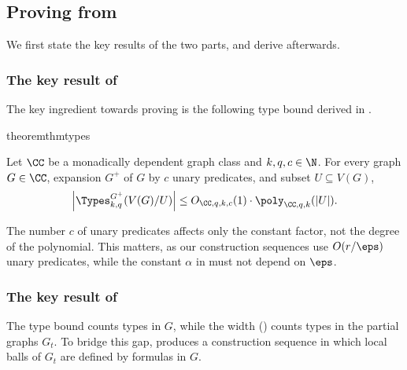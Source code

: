 \subsection{Proving \texorpdfstring{ from }{Theorem  from Parts I and II}}\label{sec:skel-few-types}

We first state the key results of the two parts, and derive  afterwards.

\subsubsection{The key result of \texorpdfstring{}{Part I}}\label{sec:skel-part-types}

The key ingredient towards proving  is the following type bound derived in .

\newif\iftypeboundgeneral
\begin{restatable}{theorem}{thmtypes}\label{thm:type-bound}

Let $\CC$ be a monadically dependent graph class and $k,q,c\in\N$.
For every \iftypeboundgeneral(possibly infinite) \fi graph $G \in \CC$, expansion $G^+$ of $G$ by $c$ unary predicates, and \iftypeboundgeneral finite \fi subset $U \subseteq V(G)$,
\[
    \left|\Types^{G^+}_{k,q}(V(G)/U)\right| \leq O_{\CC,q,k,c}(1)\cdot \poly_{\CC,q,k}(|U|).
\]

\end{restatable}

The number $c$ of unary predicates affects only the constant factor, not the degree of the polynomial.
This matters, as our construction sequences use $O(r/\eps)$ unary predicates, while the constant $\alpha$ in  must not depend on $\eps$.

\subsubsection{The key result of \texorpdfstring{}{Part II}}\label{sec:skel-part-defseq}

The type bound counts types in $G$, while the width () counts types in the partial graphs $G_t$.
To bridge this gap,  produces a construction sequence in which local balls of $G_t$ are defined by formulas in $G$.


